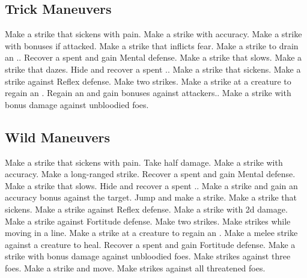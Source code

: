\subsection{Trick Maneuvers}\label{Trick Maneuvers}
\begin{spelllist}
 Make a strike that sickens with pain.
 Make a strike with  accuracy.
 Make a strike with bonuses if attacked.
 Make a strike that inflicts fear.
 Make a strike to drain an ..
 Recover a spent  and gain  Mental defense.
 Make a strike that slows.
 Make a strike that dazes.
 Hide and recover a spent ..
 Make a strike that sickens.
 Make a strike against Reflex defense.
 Make two strikes.
 Make a strike at a creature to regain an .
 Regain an  and gain bonuses against attackers..
 Make a strike with bonus damage against unbloodied foes.
\end{spelllist}



\small
\subsection{Wild Maneuvers}\label{Wild Maneuvers}
\begin{spelllist}
 Make a strike that sickens with pain.
 Take half damage.
 Make a strike with  accuracy.
 Make a long-ranged strike.
 Recover a spent  and gain  Mental defense.
 Make a strike that slows.
 Hide and recover a spent ..
 Make a strike and gain an accuracy bonus against the target.
 Jump and make a strike.
 Make a strike that sickens.
 Make a strike against Reflex defense.
 Make a strike with \plus2d damage.
 Make a strike against Fortitude defense.
 Make two strikes.
 Make strikes while moving in a line.
 Make a strike at a creature to regain an .
 Make a melee strike against a creature to heal.
 Recover a spent  and gain  Fortitude defense.
 Make a strike with bonus damage against unbloodied foes.
 Make strikes against three foes.
 Make a strike and move.
 Make strikes against all threatened foes.
\end{spelllist}

